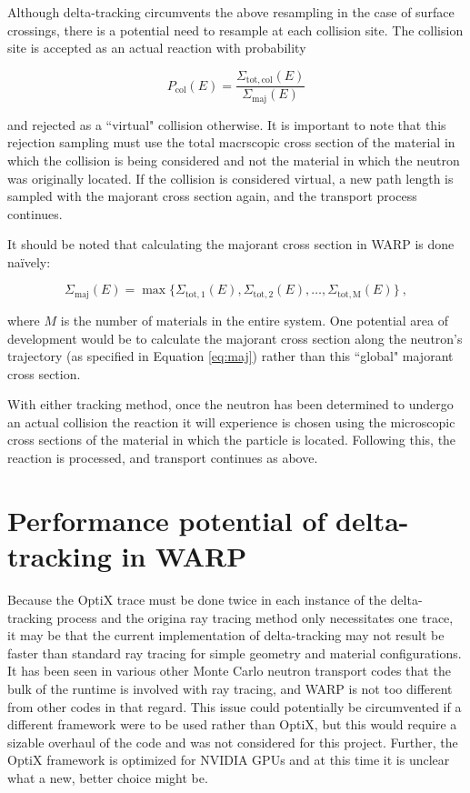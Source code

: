 Although delta-tracking circumvents the above resampling in the case of surface crossings, there is a 
potential need to resample at each collision site. The collision site is accepted as an actual reaction 
with probability

\begin{equation}
P_{\mathrm{col}}(E) = \frac{\Sigma_{\mathrm{tot,col}}(E)}{\Sigma_{\mathrm{maj}}(E)} 
\end{equation}

\noindent and rejected as a ``virtual" collision otherwise. It is important to note that this rejection
sampling must use the total macrscopic cross section of the material in which the collision is being 
considered and not the material in which the neutron was originally located. If the collision is 
considered virtual, a new path length is sampled with the majorant cross section again, and the transport
process continues.

It should be noted that calculating the majorant cross section in WARP is done na{\"i}vely:

\begin{equation}
\label{eq:majnaive}
\Sigma_{\mathrm{maj}}(E)
= \max\{\Sigma_{\mathrm{tot,1}}(E), \Sigma_{\mathrm{tot,2}}(E), \ldots, \Sigma_{\mathrm{tot,M}}(E)\}\:,
\end{equation}

\noindent where $M$ is the number of materials in the entire system. One potential area of development 
would be to
calculate the majorant cross section along the neutron's trajectory (as specified in Equation 
\ref{eq:maj}) rather than this ``global" majorant cross section.

With either tracking method, once the neutron has been determined to undergo an actual collision the 
reaction it will experience is chosen using the microscopic cross sections of the material in which 
the particle is located. Following this, the reaction is processed, and transport continues as above.

\section{Performance potential of delta-tracking in WARP}

Because the OptiX trace must be done twice in each instance of the delta-tracking process and the origina 
ray tracing method only necessitates one trace, it may be that the current implementation of 
delta-tracking may not result be faster than standard ray tracing for simple geometry and 
material configurations. It has been seen in various other Monte Carlo neutron
transport codes that the bulk of the runtime is involved with ray tracing, and WARP is not too different
from other codes in that regard.
This issue could potentially be circumvented if a different framework were to be used rather than OptiX,
but this would require a sizable overhaul of the code and was not considered for this
project. Further, the OptiX framework is optimized for NVIDIA GPUs and at this time it is unclear what
a new, better choice might be. 

